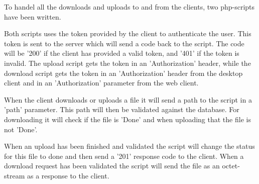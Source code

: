 To handel all the downloads and uploads to and from the clients, two php-scripts have been written. 

Both scripts uses the token provided by the client to authenticate the user. This token is sent to the server which will send a code back to the script. The code will be '200' if the client has provided a valid token, and '401' if the token is invalid. The upload script gets the token in an 'Authorization' header, while the download script gets the token in an 'Authorization' header from the desktop client and in an 'Authorization' parameter from the web client.

When the client downloads or uploads a file it will send a path to the script in a 'path' parameter. This path will then be validated against the database. For downloading it will check if the file is 'Done' and when uploading that the file is not 'Done'.

When an upload has been finished and validated the script will change the status for this file to done and then send a '201' response code to the client. When a download request has been validated the script will send the file as an octet-stream as a response to the client.
